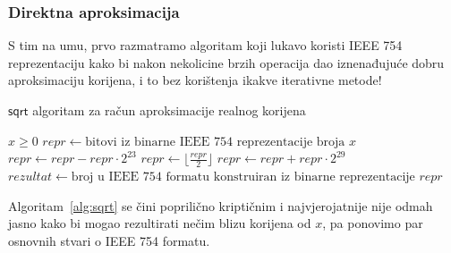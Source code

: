\documentclass[12pt]{scrartcl}
\begin{document}
\subsubsection{Direktna aproksimacija }
S tim na umu, prvo razmatramo algoritam koji lukavo koristi IEEE 754 reprezentaciju kako bi nakon nekolicine brzih operacija dao iznenađujuće
dobru aproksimaciju korijena, i to bez korištenja ikakve iterativne metode!
\begin{algorithm}
    \caption{$\mathsf{sqrt}$ algoritam za račun aproksimacije realnog korijena~\cite{lomont}}\label{alg:sqrt}
    \begin{algorithmic}[1]
    \Require $x \geq 0$
    \State $repr \gets \text{bitovi iz binarne IEEE 754 reprezentacije broja $x$}$
    \State $repr \gets repr - repr \cdot 2^{23}$
    \State $repr \gets \lfloor\frac{repr}{2}\rfloor$
    \State $repr \gets repr + repr \cdot 2^{29}$
    \State $rezultat \gets \text{broj u IEEE 754 formatu konstruiran iz binarne reprezentacije $repr$}$
    \end{algorithmic}
\end{algorithm}
Algoritam~\ref{alg:sqrt} se čini poprilično kriptičnim i najvjerojatnije nije odmah jasno kako bi mogao rezultirati nečim blizu korijena od $x$, pa
ponovimo par osnovnih stvari o IEEE 754 formatu.
\begin{figure}[h]
\end{figure}
\end{document}
